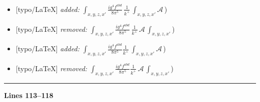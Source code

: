 \documentclass[10pt]{article}
\begin{document}
\begin{itemize}[leftmargin=2.2em,itemsep=1pt,topsep=2pt]
\item[\textbf{l.107}] \textsf{\small [typo/LaTeX]} \emph{added:} $\displaystyle \int_{x,y,z,x'}$$\displaystyle \frac{ig^{4}f^{abd}}{8\pi^{5}}\,\frac{1}{k^{+}}\,\int_{x,y,z,x'}\mathcal{A}\,${\color{gray}\small)}
\item[\textbf{l.107}] \textsf{\small [typo/LaTeX]} \emph{removed:} $\displaystyle \int_{x,y,z,x'}$$\displaystyle \frac{ig^{4}f^{abd}}{8\pi^{5}}\,\frac{1}{k^{+}}\,\mathcal{A}\,\int_{x,y,z,x'}${\color{gray}\small)}
\item[\textbf{l.108}] \textsf{\small [typo/LaTeX]} \emph{added:} $\displaystyle \int_{x,y,z,x'}$$\displaystyle \frac{ig^{4}f^{abd}}{8\pi^{5}}\frac{1}{k^{+}}\,\int_{x,y,z,x'}\mathcal{A}\,${\color{gray}\small)}
\item[\textbf{l.108}] \textsf{\small [typo/LaTeX]} \emph{removed:} $\displaystyle \int_{x,y,z,x'}$$\displaystyle \frac{ig^{4}f^{abd}}{8\pi^{5}}\frac{1}{k^{+}}\,\mathcal{A}\,\int_{x,y,z,x'}${\color{gray}\small)}
\end{itemize}
\noindent\rule{\linewidth}{0.3pt}\par\noindent\textbf{Lines 113--118} \par
\end{document}
